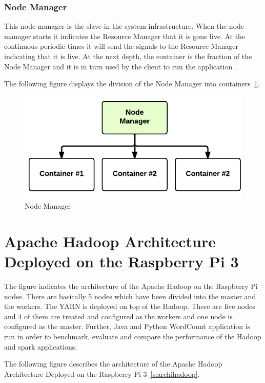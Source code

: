 \subsubsection{Node Manager}
This node manager is the slave in the system infrastructure. 
When the node manager starts it indicates the Resource Manager 
that it is gone live. At the continuous periodic times it will 
send the signals to the Resource Manager indicating that it is live. 
At the next depth, the container is the fraction of the Node Manager 
and it is in turn used by the 
client to run the application~\cite{hid-sp18-412-YARN_Hadoop_Internal}.

The following figure displays the division of the Node Manager into 
containers~\ref{s:archinode}.

\begin{figure}[!ht]
\centering\includegraphics[width=\textwidth]{images/nodemanager.png}
\caption{Node 
Manager~\cite{hid-sp18-412-YARN_Hadoop_Internal}}\label{s:archinode}
\end{figure}

\section{Apache Hadoop Architecture Deployed on the Raspberry Pi 3}
The figure indicates the architecture of the Apache Hadoop on the 
Raspberry Pi nodes. There are basically 5 nodes which have been 
divided into the master and the workers. 
The YARN is deployed on top of the Hadoop. 
There are five nodes and 4 of them are treated and 
configured as the workers and one node is configured as the 
master. Further, Java and Python WordCount application is run 
in order to benchmark, evaluate and compare the performance
 of the Hadoop and spark applications.

The following figure describes the architecture of the Apache 
Hadoop Architecture 
Deployed on the Raspberry Pi 3~\ref{s:archihadoop}.

